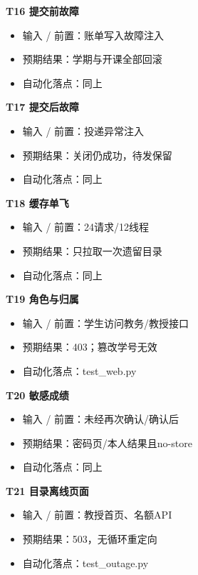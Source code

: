 \documentclass[UTF8,11pt,a4paper]{ctexart}
\providecommand{\tightlist}{\setlength{\itemsep}{0pt}\setlength{\parskip}{0pt}}
\begin{document}
\textbf{T16 提交前故障}

\begin{itemize}
\tightlist
\item
  输入 / 前置：账单写入故障注入
\item
  预期结果：学期与开课全部回滚
\item
  自动化落点：同上
\end{itemize}

\textbf{T17 提交后故障}

\begin{itemize}
\tightlist
\item
  输入 / 前置：投递异常注入
\item
  预期结果：关闭仍成功，待发保留
\item
  自动化落点：同上
\end{itemize}

\textbf{T18 缓存单飞}

\begin{itemize}
\tightlist
\item
  输入 / 前置：24请求/12线程
\item
  预期结果：只拉取一次遗留目录
\item
  自动化落点：同上
\end{itemize}

\textbf{T19 角色与归属}

\begin{itemize}
\tightlist
\item
  输入 / 前置：学生访问教务/教授接口
\item
  预期结果：403；篡改学号无效
\item
  自动化落点：test\_\allowbreak{}web.py
\end{itemize}

\textbf{T20 敏感成绩}

\begin{itemize}
\tightlist
\item
  输入 / 前置：未经再次确认/确认后
\item
  预期结果：密码页/本人结果且no-store
\item
  自动化落点：同上
\end{itemize}

\textbf{T21 目录离线页面}

\begin{itemize}
\tightlist
\item
  输入 / 前置：教授首页、名额API
\item
  预期结果：503，无循环重定向
\item
  自动化落点：test\_\allowbreak{}outage.py
\end{itemize}
\end{document}
